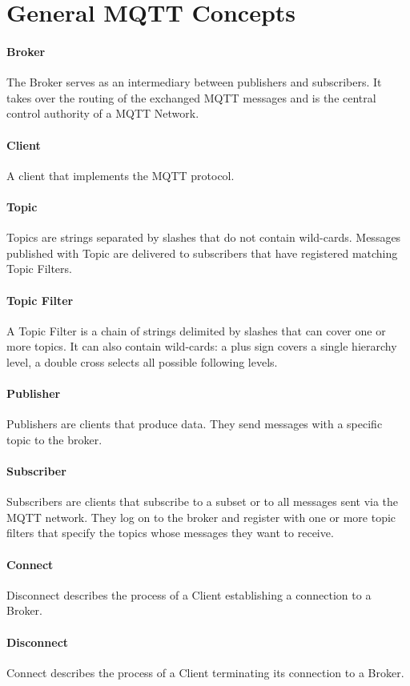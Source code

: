 \section{General MQTT Concepts}
\paragraph{Broker}
The Broker serves as an intermediary between publishers and subscribers.
It takes over the routing of the exchanged MQTT messages and is the central control authority of a MQTT Network.
\paragraph{Client}
A client that implements the MQTT protocol. 
\paragraph{Topic}
Topics are strings separated by slashes that do not contain wild-cards.
Messages published with Topic are delivered to subscribers that have registered matching Topic Filters.
\paragraph{Topic Filter}
A Topic Filter is a chain of strings delimited by slashes that 
can cover one or more topics. 
It can also contain wild-cards: a plus sign covers a single hierarchy level, a double cross selects all possible following levels.
\paragraph{Publisher}
Publishers are clients that produce data.
They send messages with a specific topic to the broker.
\paragraph{Subscriber}
Subscribers are clients that subscribe to a subset or to all messages sent via the
MQTT network.
They log on to the broker and register with one or more topic filters that specify the topics whose messages they want to receive.
\paragraph{Connect}
Disconnect describes the process of a Client establishing a connection to a Broker.
\paragraph{Disconnect}
Connect describes the process of a Client terminating its connection to a Broker.


